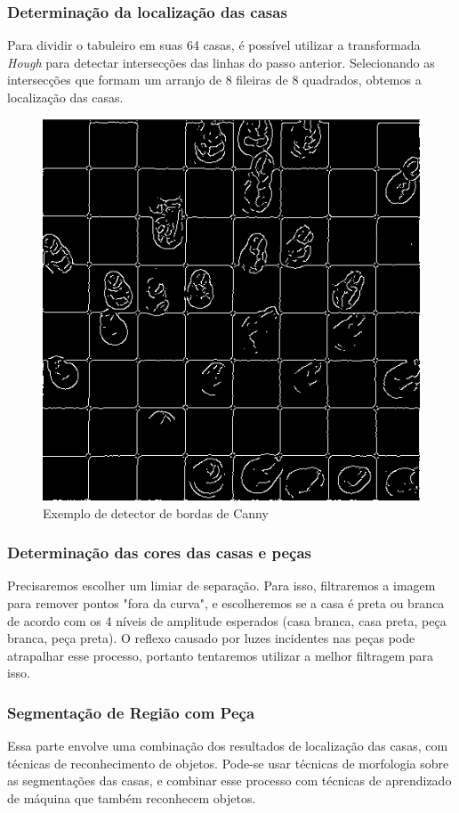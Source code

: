 \documentclass[a4paper,12pt,twoside]{article}
\begin{document}
\subsubsection{Determinação da localização das casas}
Para dividir o tabuleiro em suas 64 casas,
é possível utilizar a transformada \textit{Hough} para detectar intersecções das linhas do passo anterior.
Selecionando as intersecções que formam um arranjo de 8 fileiras de 8 quadrados,
obtemos a localização das casas.

\begin{figure}[h!]
\centering
  \includegraphics[width=0.6\linewidth]{fig/detector.png}
\caption{Exemplo de detector de bordas de Canny}
\label{fig:detector}
\end{figure}

\subsubsection{Determinação das cores das casas e peças}
Precisaremos escolher um limiar de separação.
Para isso, filtraremos a imagem para remover pontos "fora da curva",
e escolheremos se a casa é preta ou branca de acordo com os 4 níveis de amplitude esperados 
(casa branca, casa preta, peça branca, peça preta).
O reflexo causado por luzes incidentes nas peças pode atrapalhar esse processo,
portanto tentaremos utilizar a melhor filtragem para isso.

\subsubsection{Segmentação de Região com Peça}
Essa parte envolve uma combinação dos resultados de localização das casas,
com técnicas de reconhecimento de objetos.
Pode-se usar técnicas de morfologia sobre as segmentações das casas,
e combinar esse processo com técnicas de aprendizado de máquina que também reconhecem objetos.
\end{document}
